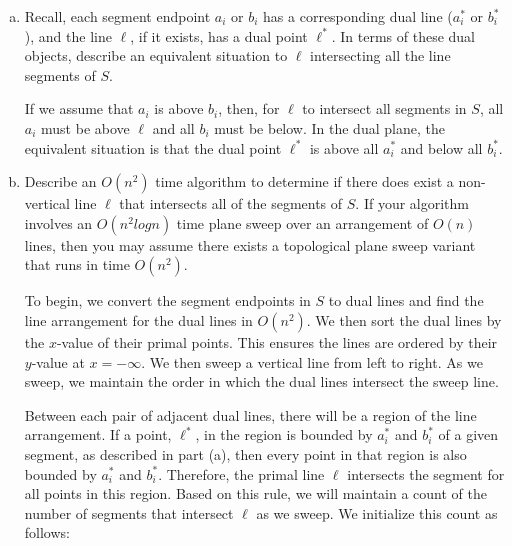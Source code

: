 \documentclass[11pt]{article}
\begin{document}
\begin{enumerate}[(a)]\itemsep0pt
  \item
    Recall, each segment endpoint \(a_i\) or \(b_i\) has a corresponding dual line (\(a^*_i\) or \(b^*_i\)), and the line \(\ell\),
    if it exists, has a dual point \(\ell^*\). In terms of these dual objects, describe an equivalent situation to \(\ell\) intersecting all the line segments of \(S\).
    
\begin{solution}
  If we assume that \(a_i\) is above \(b_i\), then, for \(\ell\) to intersect all segments in \(S\), all \(a_i\) must be above \(\ell\) and all \(b_i\) must be below. In the dual plane,
  the equivalent situation is that the dual point \(\ell^*\) is above all \(a^*_i\) and below all \(b^*_i\).
\end{solution}

  \item
    Describe an \(O(n^2)\) time algorithm to determine if there does exist a non-vertical line \(\ell\)
    that intersects all of the segments of \(S\). If your algorithm involves an \(O(n^2 log n)\) time
    plane sweep over an arrangement of \(O(n)\) lines, then you may assume there exists a
    topological plane sweep variant that runs in time \(O(n^2)\).

\begin{solution}
  To begin, we convert the segment endpoints in \(S\) to dual lines and find the line arrangement for the dual lines in \(O(n^2)\). We then sort the dual lines by the \(x\)-value of their
  primal points. This ensures the lines are ordered by their \(y\)-value at \(x=-\infty\). We then sweep a vertical line from left to right. As we sweep, we maintain the order in which
  the dual lines intersect the sweep line.
  
  Between each pair of adjacent dual lines, there will be a region of the line arrangement. If a point, \(\ell^*\), in the region is bounded by
  \(a^*_i\) and \(b^*_i\) of a given segment, as described in part (a), then every point in that region is also bounded by \(a^*_i\) and \(b^*_i\). Therefore, the primal line \(\ell\) intersects
  the segment for all points in this region. Based on this rule, we will maintain a count of the number of segments that intersect \(\ell\) as we sweep. We initialize this count as follows:


\end{solution}
\end{enumerate}
\end{document}
